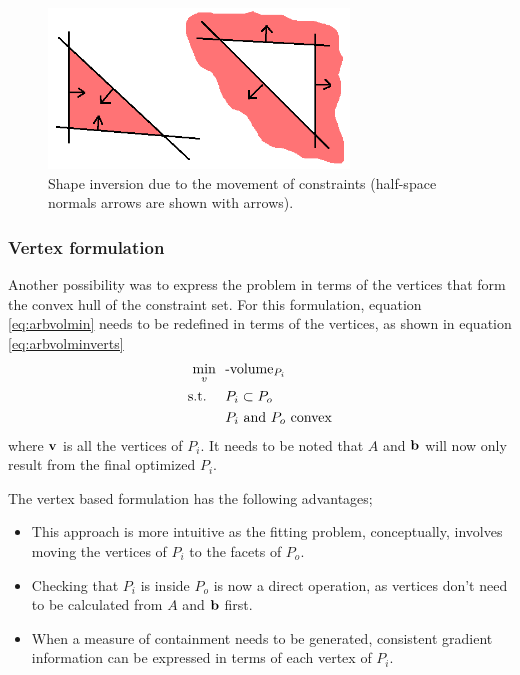 \begin{figure}[htbp]
  \centering
  \includegraphics[width=8cm]{graph/shapeinversion}
  \caption[Shape inversion example]{Shape inversion due to the movement of constraints (half-space normals arrows are shown with arrows).}
  \label{fig:shapeinversion}
\end{figure}

\subsubsection{Vertex formulation}
Another possibility was to express the problem in terms of the vertices that form the convex hull of the constraint set.
For this formulation, equation \ref{eq:arbvolmin} needs to be redefined in terms of the vertices, as shown in equation \ref{eq:arbvolminverts}
\begin{align}
  \label{eq:arbvolminverts}
    \min_{v}~~&\text{-volume}_{P_i}\\
    \text{s.t.}~~~~ &P_i \subset P_o \notag \\
                    &P_i \text{~and~} P_o \text{~convex} \notag
\end{align}
where ${\bf {v}}$ is all the vertices of $P_i$.
It needs to be noted that $A$ and ${\bf {b}}$ will now only result from the final optimized $P_i$.

The vertex based formulation has the following advantages;
\begin{itemize}
  \item This approach is more intuitive as the fitting problem, conceptually, involves moving the vertices of $P_i$ to the facets of $P_o$.
  \item Checking that $P_i$ is inside $P_o$ is now a direct operation, as vertices don't need to be calculated from $A$ and ${\bf {b}}$ first.
  \item When a measure of containment needs to be generated, consistent gradient information can be expressed in terms of each vertex of $P_i$.
\end{itemize}

